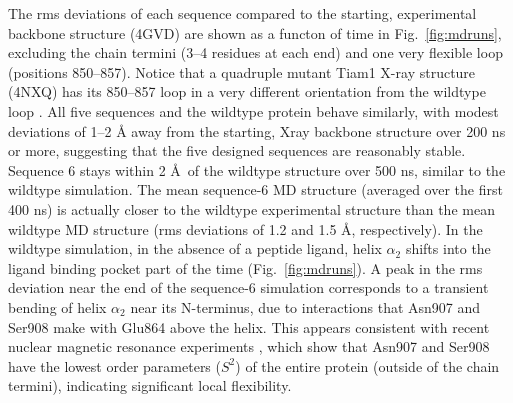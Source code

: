 \documentclass[12pt]{article}
\begin{document}
The rms deviations of each sequence compared to the starting, experimental backbone structure (4GVD) are shown as a functon of time
in Fig.\ \ref{fig:mdruns}, excluding the chain termini (3--4 residues at each end) and one very flexible loop (positions 850--857).
Notice that a quadruple mutant Tiam1 X-ray structure (4NXQ) has its 850--857 loop in a very different orientation from the wildtype
loop \cite{Liu16}. All five sequences and the wildtype protein behave similarly, with modest deviations of 1--2 {\AA} away from the
starting, Xray backbone structure over 200 ns or more, suggesting that the five designed sequences are reasonably stable. Sequence 6
stays within 2 \AA\ of the wildtype structure over 500 ns, similar to the wildtype simulation. The mean sequence-6 MD structure (averaged
over the first 400 ns) is actually closer to the wildtype experimental structure than the mean wildtype MD structure (rms deviations
of 1.2 and 1.5 \AA, respectively). In the wildtype simulation, in the absence of a peptide ligand, helix $\alpha_2$ shifts into the
ligand binding pocket part of the time (Fig.\ \ref{fig:mdruns}). A peak in the rms deviation near the end of the sequence-6 simulation
corresponds to a transient bending of helix $\alpha_2$ near its N-terminus, due to interactions that Asn907 and Ser908 make with Glu864
above the helix. This appears consistent with recent nuclear magnetic resonance experiments \cite{Liu16}, which show that Asn907 and
Ser908 have the lowest order parameters ($S^2$) of the entire protein (outside of the chain termini), indicating significant local
flexibility.
\end{document}
